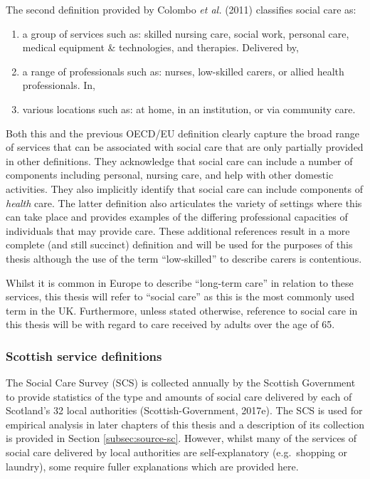 \documentclass[12pt,a4paper,oneside,table]{report}
\begin{document}
The second definition provided by Colombo \textit{et al.} (2011)
classifies social care as:

\begin{enumerate}[noitemsep, label={\alph*)}]
\item a group of services such as: skilled nursing care, social work, personal care, medical equipment \& technologies, and therapies. Delivered by,   
\item a range of  professionals such as: nurses, low-skilled carers, or allied health professionals. In,  
\item various locations such as: at home, in an institution, or via community care.
\end{enumerate}

Both this and the previous OECD/EU definition clearly capture the broad
range of services that can be associated with social care that are only
partially provided in other definitions. They acknowledge that social
care can include a number of components including personal, nursing
care, and help with other domestic activities. They also implicitly
identify that social care can include components of \emph{health} care.
The latter definition also articulates the variety of settings where
this can take place and provides examples of the differing professional
capacities of individuals that may provide care. These additional
references result in a more complete (and still succinct) definition and
will be used for the purposes of this thesis although the use of the
term ``low-skilled'' to describe carers is contentious.

Whilst it is common in Europe to describe ``long-term care'' in relation
to these services, this thesis will refer to ``social care'' as this is
the most commonly used term in the UK. Furthermore, unless stated
otherwise, reference to social care in this thesis will be with regard
to care received by adults over the age of 65.

\subsubsection{Scottish service definitions}\label{subsubsec:scot-subserv}

The Social Care Survey (SCS) is collected annually by the Scottish
Government to provide statistics of the type and amounts of social care
delivered by each of Scotland's 32 local authorities
(Scottish-Government, 2017e). The SCS is used for empirical analysis in
later chapters of this thesis and a description of its collection is
provided in Section \ref{subsec:source-sc}. However, whilst many of the
services of social care delivered by local authorities are
self-explanatory (e.g.~shopping or laundry), some require fuller
explanations which are provided here.
\end{document}
